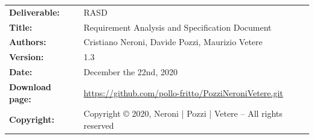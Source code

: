     \begin{table}[h!]
    \sffamily
        \begin{tabu} to \textwidth { X[0.3,r,p] X[0.7,l,p] }
            \hline
            \textbf{Deliverable:} & RASD\\
            \textbf{Title:} & Requirement Analysis and Specification Document \\
            \textbf{Authors:} & Cristiano Neroni, Davide Pozzi, Maurizio Vetere \\
            \textbf{Version:} & 1.3 \\ 
            \textbf{Date:} & December the 22nd, 2020 \\
            \textbf{Download page:} & \small \url{https://github.com/pollo-fritto/PozziNeroniVetere.git} \\
            \textbf{Copyright:} & Copyright © 2020, Neroni | Pozzi | Vetere – All rights reserved \\
            \hline
        \end{tabu}
    \end{table}
    
    
    
    
    \setcounter{page}{2}
    
    
    \newpage
    \tableofcontents
    \newpage
    \listoffigures
    \listoftables
    
    \clearpage
    {}
    
    \clearpage
    {}
      
    
